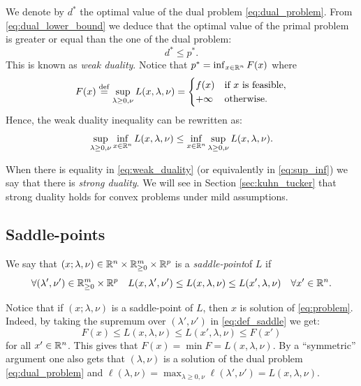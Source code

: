 \documentclass[11pt,nocut]{article}
\begin{document}
We denote by $d^*$ the optimal value of the dual problem \eqref{eq:dual_problem}.
From \eqref{eq:dual_lower_bound} we deduce that the optimal value of the primal problem is greater or equal than the one of the dual problem:
\begin{equation}\label{eq:weak_duality}
	d^* \leq p^*.
\end{equation}
This is known as \emph{weak duality}.
Notice that $p^* = \inf_{x \in \mathbb{R}^n} F(x)$ where
$$
F(x) \overset{\rm def}{=}
\sup_{\lambda \geq 0, \nu} L(x,\lambda,\nu)
=
\begin{cases}
	f(x) & \text{if} \ x \ \text{is feasible},\\
	+ \infty & \text{otherwise.}
\end{cases}
$$
Hence, the weak duality inequality can be rewritten as:
\begin{equation}\label{eq:sup_inf}
	\sup_{\lambda \geq 0, \nu} \inf_{x \in \mathbb{R}^n} L(x,\lambda,\nu) \leq \inf_{x \in \mathbb{R}^n} \sup_{\lambda \geq 0, \nu} L(x,\lambda,\nu).
\end{equation}

When there is equality in \eqref{eq:weak_duality} (or equivalently in \eqref{eq:sup_inf}) we say that there is \emph{strong duality}. We will see in Section \ref{sec:kuhn_tucker} that strong duality holds for convex problems under mild assumptions.

\subsection{Saddle-points}
\begin{definition}
We say that $(x; \lambda,\nu) \in \mathbb{R}^n \times \mathbb{R}_{\geq 0}^m \times \mathbb{R}^p$ is a \emph{saddle-point}\footnotemark of $L$ if
	\begin{equation}\label{eq:def_saddle}
	\forall (\lambda',\nu') \in \mathbb{R}_{\geq 0}^m \times \mathbb{R}^p \quad
	L(x,\lambda',\nu') \leq L(x,\lambda,\nu) \leq L(x',\lambda,\nu) \quad \forall x' \in \mathbb{R}^n.
\end{equation}
\end{definition}
Notice that if $(x; \lambda,\nu)$ is a saddle-point of $L$, then $x$ is solution of \eqref{eq:problem}. Indeed, by taking the supremum over $(\lambda',\nu')$ in \eqref{eq:def_saddle} we get:
$$
F(x) \leq L(x,\lambda,\nu) \leq L(x',\lambda,\nu) \leq F(x')
$$
for all $x' \in \mathbb{R}^n$. 
This gives that $F(x) = \min F = L(x,\lambda,\nu)$.
By a ``symmetric'' argument one also gets that $(\lambda,\nu)$ is a solution of the dual problem \eqref{eq:dual_problem} and $\ell(\lambda,\nu) = \max_{\lambda \geq 0,\nu} \ell(\lambda',\nu') = L(x,\lambda,\nu)$.
\end{document}
